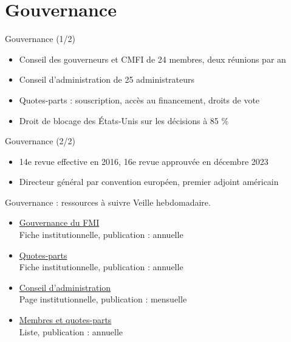 \documentclass[aspectratio=169,11pt]{beamer}
\begin{document}
\section{Gouvernance}
\begin{frame}{Gouvernance (1/2)}
\begin{itemize}
\item Conseil des gouverneurs et CMFI de 24 membres, deux réunions par an
\item Conseil d'administration de 25 administrateurs
\item Quotes-parts : souscription, accès au financement, droits de vote
\item Droit de blocage des États-Unis sur les décisions à 85 \%
\end{itemize}
\end{frame}

\begin{frame}{Gouvernance (2/2)}
\begin{itemize}
\item 14e revue effective en 2016, 16e revue approuvée en décembre 2023
\item Directeur général par convention européen, premier adjoint américain
\end{itemize}
\end{frame}

\begin{frame}{Gouvernance : ressources à suivre}
\small
Veille hebdomadaire.
\begin{itemize}
\item \href{https://www.imf.org/en/About/Factsheets/Sheets/2016/07/14/12/21/Governance-Structure}{Gouvernance du FMI}\\{\footnotesize Fiche institutionnelle, publication : annuelle}
\item \href{https://www.imf.org/en/About/Factsheets/Sheets/2016/07/14/12/21/IMF-Quotas}{Quotes-parts}\\{\footnotesize Fiche institutionnelle, publication : annuelle}
\item \href{https://www.imf.org/en/About/Executive-Board}{Conseil d'administration}\\{\footnotesize Page institutionnelle, publication : mensuelle}
\item \href{https://www.imf.org/external/np/sec/memdir/members.aspx}{Membres et quotes-parts}\\{\footnotesize Liste, publication : annuelle}
\end{itemize}
\end{frame}
\end{document}
